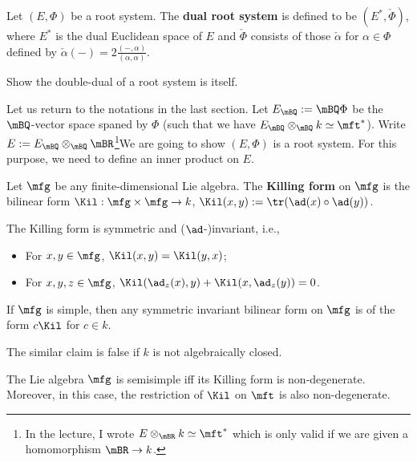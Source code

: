 \begin{defn}
	Let $(E,\Phi)$ be a root system. The \textbf{dual root system} is defined to be $(E^*,\check \Phi)$, where $E^*$ is the dual Euclidean space of $E$ and $\check\Phi$ consists of those $\check \alpha$ for $\alpha\in \Phi$ defined by $\check\alpha(-)=2\frac{ (-,\alpha) }{(\alpha,\alpha)}$.

\end{defn}

\begin{exe}
	 Show the double-dual of a root system is itself.
\end{exe}

Let us return to the notations in the last section. Let $E_\mBQ:= \mBQ \Phi$ be the $\mBQ$-vector space spaned by $\Phi$ (such that we have $E_\mBQ \otimes_\mBQ k \simeq \mft^*$). Write $E:= E_\mBQ \otimes_{\mBQ} \mBR$\footnote{
	In the lecture, I wrote $E \otimes_\mBR k \simeq \mft^*$ which is only valid if we are given a homomorphism $\mBR \to k$.
}We are going to show $(E,\Phi)$ is a root system. For this purpose, we need to define an inner product on $E$.

\begin{defn}
	Let $\mfg$ be any finite-dimensional Lie algebra. The \textbf{Killing form} on $\mfg$ is the bilinear form $\Kil: \mfg \times \mfg \to k$, $\Kil(x,y):= \tr( \ad(x)\circ \ad(y) )$.
\end{defn}

\begin{prop}
	The Killing form is symmetric and ($\ad$-)invariant, i.e., 
	\begin{itemize}
		\item 
			For $x,y\in \mfg$, $\Kil(x,y) = \Kil(y,x)$;
		\item
			For $x,y,z\in \mfg$, $\Kil(\ad_z(x),y) + \Kil(x,\ad_z(y))=0$.
	\end{itemize}
\end{prop}

\begin{prop}
	If $\mfg$ is simple, then any symmetric invariant bilinear form on $\mfg$ is of the form $c\Kil$ for $c\in k$.
\end{prop}

\begin{warn}
	The similar claim is false if $k$ is not algebraically closed.
\end{warn}


\begin{thm}
	The Lie algebra $\mfg$ is semisimple iff its Killing form is non-degenerate. Moreover, in this case, the restriction of $\Kil$ on $\mft$ is also non-degenerate.
\end{thm}

